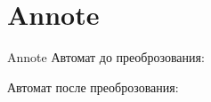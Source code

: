 \section{Annote}
\begin{frame}{Annote}
	Автомат до преоброзования:


	Автомат после преоброзования:

\end{frame}
